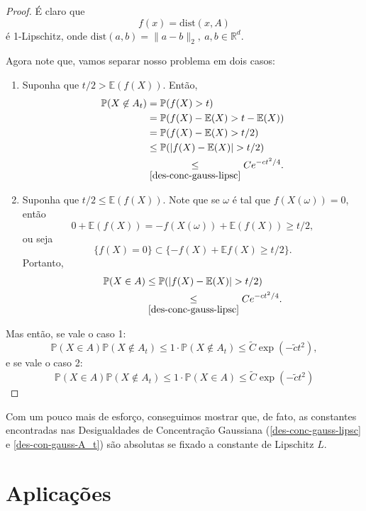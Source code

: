 \documentclass[12pt,a4paper,oneside]{book}
\theoremstyle{definition}
\theoremstyle{remark}
\numberwithin{equation}{section}
\newcommand{\R}{\mathbb{R}}
\newcommand{\E}{\mathbb{E}}
\newcommand{\pr}{\mathbb{P}}
\begin{document}
\begin{proof}
É claro que 
$$ f(x) = \textrm{dist}(x,A)$$
é 1-Lipschitz, onde
$\textrm{dist}(a,b) = \|a-b\|_2,\ a,b\in\R^d. $

Agora note que, vamos separar nosso problema em dois casos:
\begin{enumerate}
\item Suponha que $t/2>\E(f(X)) $. Então, 
\begin{align*}
\pr(X\not\in A_t)& = \pr(f(X)>t) \\
& = \pr(f(X)-\E(X)>t-\E(X)) \\ 
& = \pr(f(X)-\E(X)>t/2) \\
&\leq  \pr(|f(X)-\E(X)|>t/2) \\
&\underset{\ref{des-conc-gauss-lipsc}}{\leq} Ce^{-ct^2/4}.  
\end{align*}

\item Suponha que $t/2\leq \E(f(X)) $. Note que se $\omega$ é tal que $f(X(\omega))=0$, então
$$0 + \E(f(X)) = -f(X(\omega)) + \E(f(X))\geq t/2,$$
ou seja
$$\{f(X)=0\} \subset \{ -f(X)+\E f(X)\geq t/2 \}.$$
Portanto,
\begin{align*}
\pr(X\in A)& \leq  \pr(|f(X)-\E(X)|>t/2) \\
&\underset{\ref{des-conc-gauss-lipsc}}{\leq} Ce^{-ct^2/4}.  
\end{align*}
\end{enumerate}

Mas então, se vale o caso 1:
$$\pr(X\in A)\pr(X\not\in A_t)\leq 1\cdot \pr(X\not\in A_t)\leq \tilde{C}\exp(-\tilde{c}t ^2),  $$
e se vale o caso 2:
$$\pr(X\in A)\pr(X\not\in A_t)\leq 1\cdot \pr(X\in A)\leq \tilde{C}\exp(-\tilde{c}t ^2) $$
\end{proof}


\begin{tcolorbox}[colback = yellow!60]
Com um pouco mais de esforço, conseguimos mostrar que, de fato, as constantes encontradas nas Desigualdades de Concentração Gaussiana (\ref{des-conc-gauss-lipsc} e \ref{des-con-gauss-A_t}) são absolutas se fixado a constante de Lipschitz $L$.
\end{tcolorbox}








\newpage
\section{Aplicações}
\end{document}

